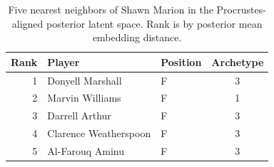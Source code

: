 \begin{table}[htbp]
  \centering\small
  \begin{tabular}{rllc}
    \toprule
    Rank & Player & Position & Archetype \\
    \midrule
    1 & Donyell Marshall & F & 3 \\
    2 & Marvin Williams & F & 1 \\
    3 & Darrell Arthur & F & 3 \\
    4 & Clarence Weatherspoon & F & 3 \\
    5 & Al-Farouq Aminu & F & 3 \\
    \bottomrule
  \end{tabular}
  \caption{Five nearest neighbors of Shawn Marion in the Procrustes-aligned posterior latent space. Rank is by posterior mean embedding distance.}
  \label{tab:Shawn_Marion_neighbors}
\end{table}

